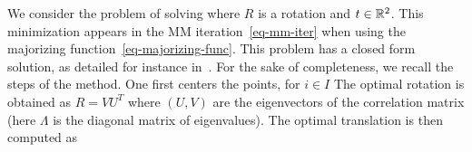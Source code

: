 We consider the problem of solving
where $R$ is a rotation and $t \in \mathbb{R}^2$. 
This minimization appears in the MM iteration~\eqref{eq-mm-iter} when using the majorizing function~\eqref{eq-majorizing-func}. This problem has a closed form solution, as detailed for instance in~\cite{maurer_1996}. For the sake of completeness, we recall the steps of the method. One first centers the points, for $i \in I$
The optimal rotation is obtained as $R = V U^T$ where $(U,V)$ are the eigenvectors of the correlation matrix
(here $\Lambda$ is the diagonal matrix of eigenvalues). 
The optimal translation is then computed as 


